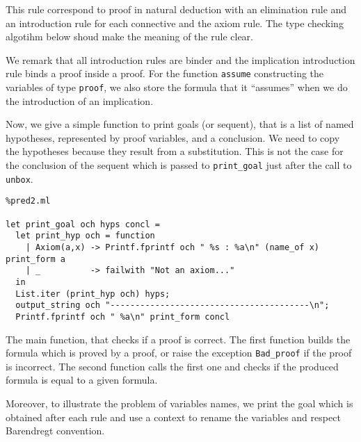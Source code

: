 \documentclass[11pt]{article}
\begin{document}
This rule correspond to proof in natural deduction with an elimination
rule and an introduction rule for each connective and the axiom rule.
The type checking algotihm below shoud make the meaning of the rule clear.

We remark that all introduction rules are binder and the
implication introduction rule binds a proof inside a proof.
For the function \verb#assume# constructing the variables of type
\verb#proof#, we also store the formula that it ``assumes'' when we do
the introduction of an implication.

Now, we give a simple function to print goals (or sequent), that is a
list of named hypotheses, represented by proof variables, and a
conclusion. We need to copy the hypotheses because they result from a
substitution. This is not the case for the conclusion of the sequent
which is passed to \verb#print_goal# just after the call to \verb#unbox#.
\begin{lstlisting}%pred2.ml

let print_goal och hyps concl =
  let print_hyp och = function
    | Axiom(a,x) -> Printf.fprintf och " %s : %a\n" (name_of x) print_form a
    | _          -> failwith "Not an axiom..."
  in
  List.iter (print_hyp och) hyps;
  output_string och "----------------------------------------\n";
  Printf.fprintf och " %a\n" print_form concl
\end{lstlisting}

The main function, that checks if a proof is correct. The first
function builds the formula which is proved by a proof, or raise the
exception \verb#Bad_proof# if the proof is incorrect.
The second function calls the first one and checks if the produced
formula is equal to a given formula.

Moreover, to illustrate the problem of variables names, we print the
goal which is obtained after each rule and use a context to rename the
variables and respect Barendregt convention.
\end{document}
